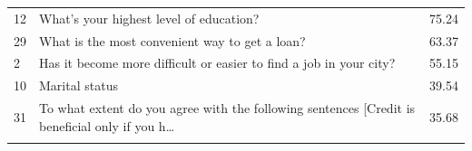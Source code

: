 \begin{longtable}[]{@{}lll@{}}
\begin{minipage}[t]{0.05\columnwidth}
12\strut
\end{minipage} & \begin{minipage}[t]{0.77\columnwidth}\raggedright
What's your highest level of education?\strut
\end{minipage} & \begin{minipage}[t]{0.09\columnwidth}\raggedright
75.24\strut
\end{minipage}\tabularnewline
\begin{minipage}[t]{0.05\columnwidth}\raggedright
29\strut
\end{minipage} & \begin{minipage}[t]{0.77\columnwidth}\raggedright
What is the most convenient way to get a loan?\strut
\end{minipage} & \begin{minipage}[t]{0.09\columnwidth}\raggedright
63.37\strut
\end{minipage}\tabularnewline
\begin{minipage}[t]{0.05\columnwidth}\raggedright
2\strut
\end{minipage} & \begin{minipage}[t]{0.77\columnwidth}\raggedright
Has it become more difficult or easier to find a job in your city?\strut
\end{minipage} & \begin{minipage}[t]{0.09\columnwidth}\raggedright
55.15\strut
\end{minipage}\tabularnewline
\begin{minipage}[t]{0.05\columnwidth}\raggedright
10\strut
\end{minipage} & \begin{minipage}[t]{0.77\columnwidth}\raggedright
Marital status\strut
\end{minipage} & \begin{minipage}[t]{0.09\columnwidth}\raggedright
39.54\strut
\end{minipage}\tabularnewline
\begin{minipage}[t]{0.05\columnwidth}\raggedright
31\strut
\end{minipage} & \begin{minipage}[t]{0.77\columnwidth}\raggedright
To what extent do you agree with the following sentences {[}Credit is
beneficial only if you h\ldots{}\strut
\end{minipage} & \begin{minipage}[t]{0.09\columnwidth}\raggedright
35.68\strut
\end{minipage}\tabularnewline
\begin{minipage}[t]{0.05\columnwidth}\raggedright

\end{minipage}
\end{longtable}

